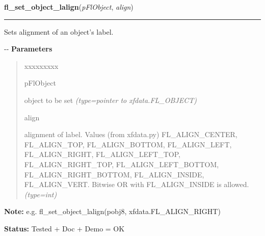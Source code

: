 \hspace{.8\funcindent}\begin{boxedminipage}{\funcwidth}

    \raggedright \textbf{fl\_set\_object\_lalign}(\textit{pFlObject}, \textit{align})

    \vspace{-1.5ex}

    \rule{\textwidth}{0.5\fboxrule}
\setlength{\parskip}{2ex}

Sets alignment of an object's label.

-{}-
\setlength{\parskip}{1ex}
      \textbf{Parameters}
      \vspace{-1ex}

      \begin{quote}
        \begin{Ventry}{xxxxxxxxx}

          \item[pFlObject]


object to be set
            {\it (type=pointer to xfdata.FL\_OBJECT)}

          \item[align]


alignment of label. Values (from xfdata.py) FL\_ALIGN\_CENTER,
FL\_ALIGN\_TOP, FL\_ALIGN\_BOTTOM, FL\_ALIGN\_LEFT, FL\_ALIGN\_RIGHT,
FL\_ALIGN\_LEFT\_TOP, FL\_ALIGN\_RIGHT\_TOP, FL\_ALIGN\_LEFT\_BOTTOM,
FL\_ALIGN\_RIGHT\_BOTTOM, FL\_ALIGN\_INSIDE, FL\_ALIGN\_VERT.
Bitwise OR with FL\_ALIGN\_INSIDE is allowed.
            {\it (type=int)}

        \end{Ventry}

      \end{quote}

\textbf{Note:} 
e.g. fl\_set\_object\_lalign(pobj8, xfdata.FL\_ALIGN\_RIGHT)


\textbf{Status:} 
Tested + Doc + Demo = OK


    \end{boxedminipage}

    \label{xformslib:flbasic:fl_get_object_lalign}

    \vspace{0.5ex}

